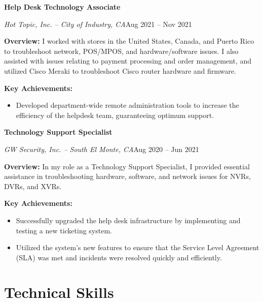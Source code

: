 \documentclass[a4paper]{article}
\begin{document}
\vspace{1.5em}
\begin{minipage}{\textwidth}
\textbf{Help Desk Technology Associate}\par
\textit{Hot Topic, Inc. -- City of Industry, CA}\hfill Aug 2021 -- Nov 2021

\medskip
\textbf{Overview:} I worked with stores in the United States, Canada, and Puerto Rico to troubleshoot network, POS/MPOS, and hardware/software issues. I also assisted with issues relating to payment processing and order management, and utilized Cisco Meraki to troubleshoot Cisco router hardware and firmware.

\medskip
\textbf{Key Achievements:}
\begin{itemize}
    \item Developed department-wide remote administration tools to increase the efficiency of the helpdesk team, guaranteeing optimum support.
\end{itemize}
\end{minipage}

\vspace{1.5em}
\begin{minipage}{\textwidth}
\textbf{Technology Support Specialist}\par
\textit{GW Security, Inc. -- South El Monte, CA}\hfill Aug 2020 -- Jun 2021

\medskip
\textbf{Overview:} In my role as a Technology Support Specialist, I provided essential assistance in troubleshooting hardware, software, and network issues for NVRs, DVRs, and XVRs.

\medskip
\textbf{Key Achievements:}
\begin{itemize}
    \item Successfully upgraded the help desk infrastructure by implementing and testing a new ticketing system.
    \item Utilized the system's new features to ensure that the Service Level Agreement (SLA) was met and incidents were resolved quickly and efficiently.
\end{itemize}
\end{minipage}

\section{Technical Skills}
\begin{minipage}{\textwidth}
\begin{itemize}
    \apptechnicalskills{}
\end{itemize}
\end{minipage}
\end{document}
